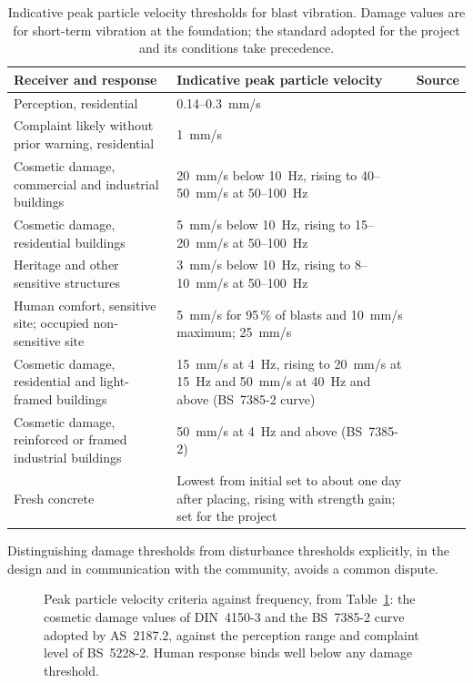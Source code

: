 \begin{table}[htbp]
\caption{Indicative peak particle velocity thresholds for blast vibration.
Damage values are for short-term vibration at the foundation; the standard
adopted for the project and its conditions take precedence.}
\label{tab:vibration-limits}
\centering
\small
\begin{tabularx}{\textwidth}{p{} X p{}}
\toprule
\textbf{Receiver and response} & \textbf{Indicative peak particle velocity} & \textbf{Source} \\
\midrule
Perception, residential & 0.14--0.3~mm/s & \citet{bs5228part2} \\
Complaint likely without prior warning, residential & 1~mm/s & \citet{bs5228part2} \\
Cosmetic damage, commercial and industrial buildings & 20~mm/s below 10~Hz, rising to 40--50~mm/s at 50--100~Hz & \citet{din4150part3} \\
Cosmetic damage, residential buildings & 5~mm/s below 10~Hz, rising to 15--20~mm/s at 50--100~Hz & \citet{din4150part3} \\
Heritage and other sensitive structures & 3~mm/s below 10~Hz, rising to 8--10~mm/s at 50--100~Hz & \citet{din4150part3} \\
Human comfort, sensitive site; occupied non-sensitive site & 5~mm/s for 95\,\% of blasts and 10~mm/s maximum; 25~mm/s & \citet{as2187part2} \\
Cosmetic damage, residential and light-framed buildings & 15~mm/s at 4~Hz, rising to 20~mm/s at 15~Hz and 50~mm/s at 40~Hz and above (BS~7385-2 curve) & \citet{as2187part2} \\
Cosmetic damage, reinforced or framed industrial buildings & 50~mm/s at 4~Hz and above (BS~7385-2) & \citet{as2187part2} \\
Fresh concrete & Lowest from initial set to about one day after placing, rising with strength gain; set for the project & \citet{hulshizer1984shock} \\
\bottomrule
\end{tabularx}
\end{table}

Distinguishing damage thresholds from disturbance thresholds explicitly, in
the design and in communication with the community, avoids a common
dispute.

\begin{figure}[htbp]
\centering
{}
\caption{Peak particle velocity criteria against frequency, from Table~\ref{tab:vibration-limits}: the cosmetic damage values of DIN~4150-3 and the BS~7385-2 curve adopted by AS~2187.2, against the perception range and complaint level of BS~5228-2. Human response binds well below any damage threshold.}
\label{fig:vibration-criteria}
\end{figure}

